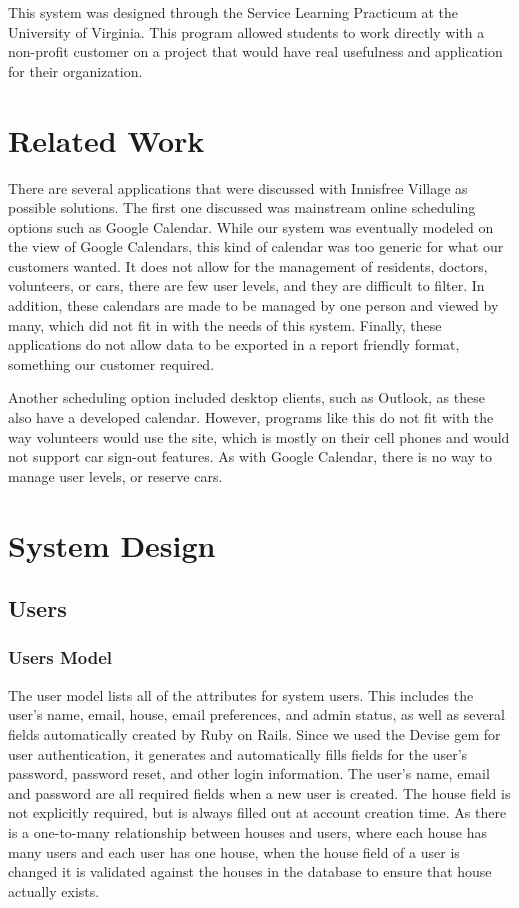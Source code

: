 \documentclass{sig-alternate}
\begin{document}
This system was designed through the Service Learning Practicum at the University of Virginia. This program allowed students to work directly with a non-profit customer on a project that would have real usefulness and application for their organization. 

\section{Related Work}
There are several applications that were discussed with Innisfree Village as possible solutions. The first one discussed was mainstream online scheduling options such as Google Calendar. While our system was eventually modeled on the view of Google Calendars, this kind of calendar was too generic for what our customers wanted. It does not allow for the management of residents, doctors, volunteers, or cars, there are few user levels, and they are difficult to filter. In addition, these calendars are made to be managed by one person and viewed by many, which did not fit in with the needs of this system. Finally, these applications do not allow data to be exported in a report friendly format, something our customer required.
	
Another scheduling option included desktop clients, such as Outlook, as these also have a developed calendar. However, programs like this do not fit with the way volunteers would use the site, which is mostly on their cell phones and would not support car sign-out features. As with Google Calendar, there is no way to manage user levels, or reserve cars.

\section{System Design}

\subsection{Users}

\subsubsection{Users Model}
The user model lists all of the attributes for system users. This includes the user’s name, email, house, email preferences, and admin status, as well as several fields automatically created by Ruby on Rails. Since we used the Devise gem \cite{devise} for user authentication, it generates and automatically fills fields for the user's password, password reset, and other login information. The user's name, email and password are all required fields when a new user is created. The house field is not explicitly required, but is always filled out at account creation time. As there is a one-to-many relationship between houses and users, where each house has many users and each user has one house, when the house field of a user is changed it is validated against the houses in the database to ensure that house actually exists.
\end{document}
